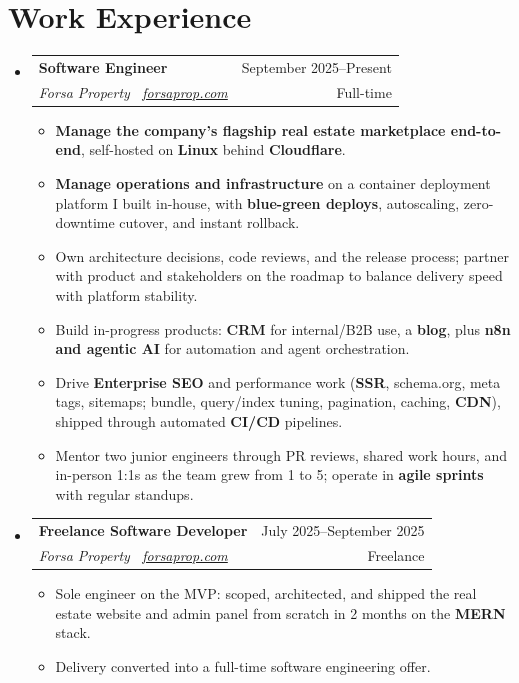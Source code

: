 \documentclass[a4paper,12pt]{article}
\makeatletter
\newcommand{\resumeSubheading}[4]{
\vspace{0.5mm}\item
    \begin{tabular*}{0.98\textwidth}[t]{l@{\extracolsep{\fill}}r}
        \textbf{#1} & {\footnotesize{#4}} \\
        \textit{\footnotesize{#3}} &  \footnotesize{#2}\\
    \end{tabular*}
    \vspace{-2.4mm}
}
\newcommand{\resumeSubHeadingListStart}{\begin{itemize}[leftmargin=*,labelsep=0mm]}
\newcommand{\resumeItemListStart}{\begin{justify}\begin{itemize}[leftmargin=3ex, rightmargin=2ex, noitemsep,labelsep=1.2mm,itemsep=0mm]}
\newcommand{\resumeSubHeadingListEnd}{\end{itemize}\vspace{1mm}}
\newcommand{\resumeItemListEnd}{\end{itemize}\end{justify}\vspace{-2mm}}
\makeatother
\begin{document}
\section{\textbf{Work Experience}}
  \resumeSubHeadingListStart
    \resumeSubheading
      {Software Engineer}{Full-time}
      {Forsa Property \, \href{https://forsaprop.com}{\normalfont forsaprop.com}}{September 2025--Present}
      \vspace{-1.5mm}
      \resumeItemListStart
    \item {\textbf{Manage the company's flagship real estate marketplace end-to-end}, self-hosted on \textbf{Linux} behind \textbf{Cloudflare}.}
    \item {\textbf{Manage operations and infrastructure} on a container deployment platform I built in-house, with \textbf{blue-green deploys}, autoscaling, zero-downtime cutover, and instant rollback.}
    \item {Own architecture decisions, code reviews, and the release process; partner with product and stakeholders on the roadmap to balance delivery speed with platform stability.}
    \item {Build in-progress products: \textbf{CRM} for internal/B2B use, a \textbf{blog}, plus \textbf{n8n and agentic AI} for automation and agent orchestration.}
    \item {Drive \textbf{Enterprise SEO} and performance work (\textbf{SSR}, schema.org, meta tags, sitemaps; bundle, query/index tuning, pagination, caching, \textbf{CDN}), shipped through automated \textbf{CI/CD} pipelines.}
    \item {Mentor two junior engineers through PR reviews, shared work hours, and in-person 1:1s as the team grew from 1 to 5; operate in \textbf{agile sprints} with regular standups.}
    \resumeItemListEnd
    \vspace{1mm}
    \resumeSubheading
      {Freelance Software Developer}{Freelance}
      {Forsa Property \, \href{https://forsaprop.com}{\normalfont forsaprop.com}}{July 2025--September 2025}
      \vspace{-1.5mm}
      \resumeItemListStart
    \item {Sole engineer on the MVP: scoped, architected, and shipped the real estate website and admin panel from scratch in 2 months on the \textbf{MERN} stack.}
    \item {Delivery converted into a full-time software engineering offer.}
    \resumeItemListEnd
  \resumeSubHeadingListEnd
\vspace{-3.5mm}
\end{document}
